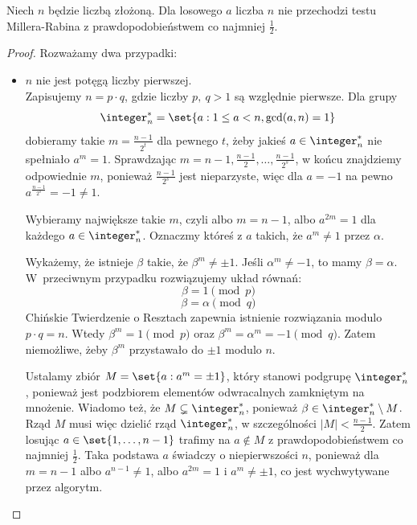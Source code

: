\begin{lemma}
	Niech \( n \) będzie liczbą złożoną. Dla losowego \( a \) liczba \( n \) nie przechodzi testu Millera-Rabina z prawdopodobieństwem co najmniej \( \frac{1}{2} \).
\end{lemma}
\begin{proof}
	Rozważamy dwa przypadki:
	\begin{itemize}
		\item \( n \) nie jest potęgą liczby pierwszej. \\
		      Zapisujemy \( n = p \cdot q \), gdzie liczby \( p, \ q > 1 \) są względnie pierwsze.
		      Dla grupy
		      \[
			      \integer_n^* = \set{a : 1 \le a < n, \gcd(a,n) = 1}
		      \]
		      dobieramy takie \( m = \frac{n-1}{2^t} \) dla pewnego \( t \), żeby jakieś \( a \in \integer_n^* \) nie spełniało \( a^m = 1 \).
		      Sprawdzając \( m = n-1, \frac{n-1}{2}, \dots, \frac{n-1}{2^s} \), w końcu znajdziemy odpowiednie \( m \), ponieważ \( \frac{n-1}{2^s} \) jest nieparzyste, więc dla \( a = -1\)  na pewno \( a^{\frac{n-1}{2^s}} = -1 \ne 1 \).

		      Wybieramy największe takie \( m \), czyli albo \( m = n - 1 \), albo \( a^{2m} = 1 \) dla każdego \( a \in \integer_n^* \). Oznaczmy któreś z \( a \) takich, że \( a^m \neq 1 \) przez \( \alpha \).

		      Wykażemy, że istnieje \( \beta \) takie, że \( \beta^m \neq \pm 1 \). Jeśli \( \alpha^m \neq -1 \), to mamy \( \beta = \alpha \). W~przeciwnym przypadku rozwiązujemy układ równań:
		      \[
			      \beta = 1 \pmod{p}
		      \]
		      \[
			      \beta = \alpha \pmod{q}
		      \]
		      Chińskie Twierdzenie o Resztach zapewnia istnienie rozwiązania modulo \( p \cdot q = n \). Wtedy \( \beta^m = 1 \pmod{p} \) oraz \( \beta^m = \alpha^m = -1 \pmod{q} \).
		      Zatem niemożliwe, żeby \( \beta^m \) przystawało do \( \pm 1 \) modulo \( n \).

		      Ustalamy zbiór \( M = \set{a : a^m = \pm 1} \), który stanowi podgrupę \( \integer_n^* \), ponieważ jest podzbiorem elementów odwracalnych zamkniętym na mnożenie.
		      Wiadomo też, że \( M \subsetneq \integer_n^* \), ponieważ \( \beta \in \integer_n^* \setminus M \). Rząd \( M \) musi więc dzielić rząd \( \integer_n^* \), w szczególności \( |M| < \frac{n-1}{2} \).
		      Zatem losując \( a \in \set{1, \dots, n-1} \) trafimy na \( a \notin M \) z prawdopodobieństwem co najmniej \( \frac{1}{2} \). Taka podstawa \( a \) świadczy o niepierwszości \( n \), ponieważ dla \( m = n-1 \) albo \( a^{n-1} \neq 1 \), albo \( a^{2m} = 1 \) i \( a^m \neq \pm 1 \), co jest wychwytywane przez algorytm.


\end{itemize}
\end{proof}
